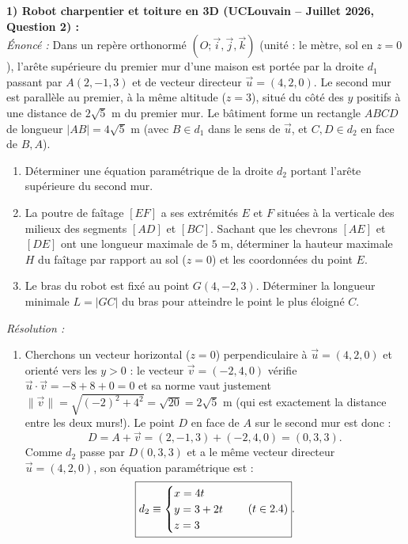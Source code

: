 \begin{exemple}
\textbf{1) Robot charpentier et toiture en 3D (UCLouvain -- Juillet 2026, Question 2) :}\\
\emph{Énoncé :} Dans un repère orthonormé $(O;\vec{i},\vec{j},\vec{k})$ (unité : le mètre, sol en $z=0$), l'arête supérieure du premier mur d'une maison est portée par la droite $d_1$ passant par $A(2, -1, 3)$ et de vecteur directeur $\vec{u} = (4, 2, 0)$. Le second mur est parallèle au premier, à la même altitude ($z=3$), situé du côté des $y$ positifs à une distance de $2\sqrt{5}\text{ m}$ du premier mur. Le bâtiment forme un rectangle $ABCD$ de longueur $|AB| = 4\sqrt{5}\text{ m}$ (avec $B \in d_1$ dans le sens de $\vec{u}$, et $C, D \in d_2$ en face de $B, A$).
\begin{enumerate}[label=(\alph*)]
    \item Déterminer une équation paramétrique de la droite $d_2$ portant l'arête supérieure du second mur.
    \item La poutre de faîtage $[EF]$ a ses extrémités $E$ et $F$ situées à la verticale des milieux des segments $[AD]$ et $[BC]$. Sachant que les chevrons $[AE]$ et $[DE]$ ont une longueur maximale de $5\text{ m}$, déterminer la hauteur maximale $H$ du faîtage par rapport au sol ($z=0$) et les coordonnées du point $E$.
    \item Le bras du robot est fixé au point $G(4, -2, 3)$. Déterminer la longueur minimale $L = |GC|$ du bras pour atteindre le point le plus éloigné $C$.
\end{enumerate}
\emph{Résolution :}
\begin{enumerate}[label=(\alph*)]
    \item Cherchons un vecteur horizontal ($z=0$) perpendiculaire à $\vec{u} = (4, 2, 0)$ et orienté vers les $y > 0$ : le vecteur $\vec{v} = (-2, 4, 0)$ vérifie $\vec{u} \cdot \vec{v} = -8 + 8 + 0 = 0$ et sa norme vaut justement $\|\vec{v}\| = \sqrt{(-2)^2 + 4^2} = \sqrt{20} = 2\sqrt{5}\text{ m}$ (qui est exactement la distance entre les deux murs!). Le point $D$ en face de $A$ sur le second mur est donc :
    \[
        D = A + \vec{v} = (2, -1, 3) + (-2, 4, 0) = (0, 3, 3).
    \]
    Comme $d_2$ passe par $D(0,3,3)$ et a le même vecteur directeur $\vec{u} = (4,2,0)$, son équation paramétrique est :
    \[
        \boxed{d_2 \equiv \begin{cases} x = 4t \\ y = 3 + 2t \\ z = 3 \end{cases} \quad (t \in 2.4)}.
\]
\end{enumerate}
\end{exemple}
